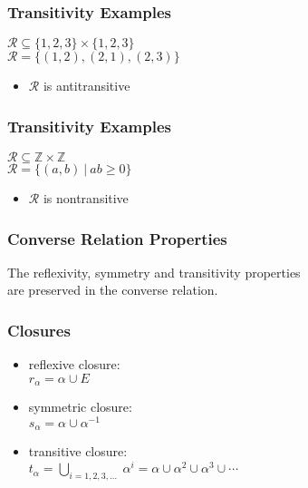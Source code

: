 \documentclass[dvipsnames]{beamer}
\begin{document}
\begin{frame}
  \frametitle{Transitivity Examples}

  \begin{example}
    $\mathcal{R} \subseteq \{1,2,3\} \times \{1,2,3\}$\\
    $\mathcal{R} = \{(1,2), (2,1), (2,3)\}$

    \medskip
    \begin{itemize}
      \item $\mathcal{R}$ is antitransitive
    \end{itemize}
  \end{example}
\end{frame}

\begin{frame}
  \frametitle{Transitivity Examples}

  \begin{example}
    $\mathcal{R} \subseteq \mathbb{Z} \times \mathbb{Z}$\\
    $\mathcal{R} = \{(a,b)~|~ab \geq 0\}$

    \medskip
    \begin{itemize}
      \item $\mathcal{R}$ is nontransitive
    \end{itemize}
  \end{example}
\end{frame}

\begin{frame}
  \frametitle{Converse Relation Properties}

  \begin{theorem}
    The reflexivity, symmetry and transitivity properties\\
    are preserved in the converse relation.
  \end{theorem}
\end{frame}

\begin{frame}
  \frametitle{Closures}

  \begin{itemize}
    \item reflexive closure:\\
      $r_{\alpha} = \alpha \cup E$

    \pause
    \medskip
    \item symmetric closure:\\
      $s_{\alpha} = \alpha \cup \alpha^{-1}$

    \pause
    \medskip
    \item transitive closure:\\
      $t_{\alpha} = \bigcup_{i=1,2,3, \ldots}~\alpha^i
        = \alpha \cup \alpha^2 \cup \alpha^3 \cup \cdots$
  \end{itemize}
\end{frame}
\end{document}
